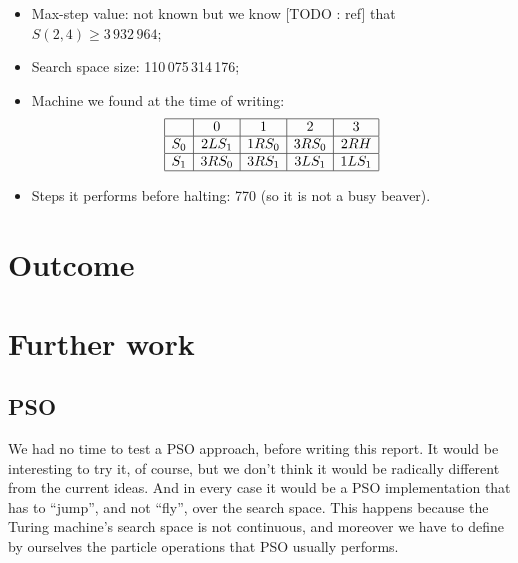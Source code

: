\documentclass{report}
\begin{document}
\begin{itemize}
\item Max-step value: not known but we know [TODO : ref] that $S(2,4) \geq 3\,932\,964$;
\item Search space size: 110\,075\,314\,176;
\item Machine we found at the time of writing:
\[
\begin{array}[h]{|c|c|c|c|c|}
  \hline
  &  0&   1&   2&   3\\
  \hline
  S_0& 2LS_1& 1RS_0& 3RS_0& 2RH\\
  \hline
  S_1& 3RS_0& 3RS_1& 3LS_1& 1LS_1\\
  \hline
\end{array}
\]
\item Steps it performs before halting: 770 (so it is not a busy beaver).
\end{itemize}



\chapter{Outcome}
\label{chap:outcome}


\chapter{Further work}
\label{chap:fwork}

\section{PSO}
We had no time to test a PSO approach, before writing this report. It would be interesting to try it, of course, but we don't think it would be radically different from the current ideas. And in every case it would be a PSO implementation that has to ``jump'', and not ``fly'', over the search space. This happens because the Turing machine's search space is not continuous, and moreover we have to define by ourselves the particle operations that PSO usually performs.
\end{document}

